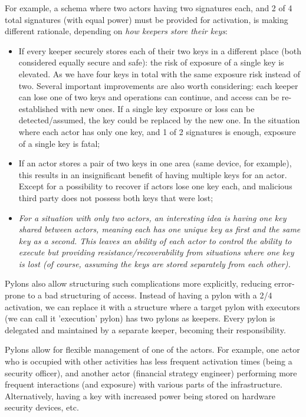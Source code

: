 \documentclass[12pt]{article}
\begin{document}
For example, a schema where two actors having two signatures each, and 2 of 4 total signatures (with equal power) must be provided for activation, is making different rationale, depending on \emph{how keepers store their keys}:
\begin{itemize}
\item{If every keeper securely stores each of their two keys in a different place (both considered equally secure and safe): the risk of exposure of a single key is elevated. As we have four keys in total with the same exposure risk instead of two. Several important improvements are also worth considering: each keeper can lose one of two keys and operations can continue, and access can be re-established with new ones. If a single key exposure or loss can be detected/assumed, the key could be replaced by the new one. In the situation where each actor has only one key, and 1 of 2 signatures is enough, exposure of a single key is fatal;}
\item{If an actor stores a pair of two keys in one area (same device, for example), this results in an insignificant benefit of having multiple keys for an actor. Except for a possibility to recover if actors lose one key each, and malicious third party does not possess both keys that were lost;}
\item{\emph{For a situation with only two actors, an interesting idea is having one key shared between actors, meaning each has one unique key as first and the same key as a second. This leaves an ability of each actor to control the ability to execute but providing resistance/recoverability from situations where one key is lost (of course, assuming the keys are stored separately from each other).}}
\end{itemize}

Pylons also allow structuring such complications more explicitly, reducing error-prone to a bad structuring of access. Instead of having a pylon with a 2/4 activation, we can replace it with a structure where a target pylon with executors (we can call it 'execution' pylon) has two pylons as keepers. Every pylon is delegated and maintained by a separate keeper, becoming their responsibility.

Pylons allow for flexible management of one of the actors. For example, one actor who is occupied with other activities has less frequent activation times (being a security officer), and another actor (financial strategy engineer) performing more frequent interactions (and exposure) with various parts of the infrastructure. Alternatively, having a key with increased power being stored on hardware security devices, etc.
\end{document}
